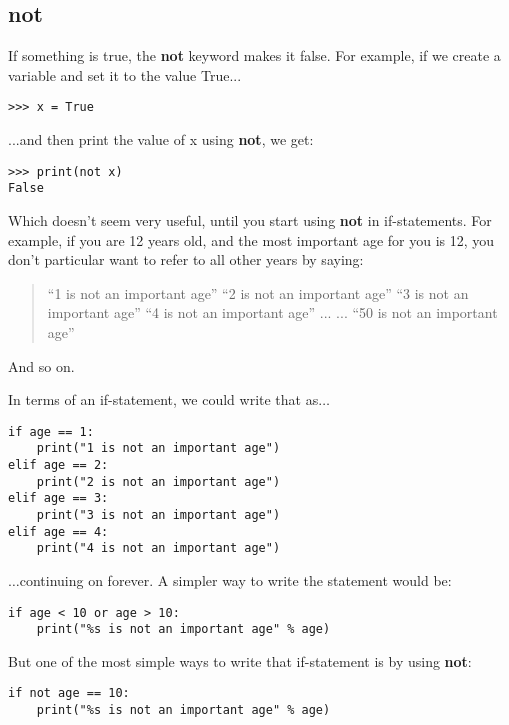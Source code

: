 \subsection*{not}

If something is true, the \textbf{not} keyword makes it false.  For example, if we create a variable  and set it to the value True...

\begin{Verbatim}[frame=single]
>>> x = True
\end{Verbatim}

...and then print the value of x using \textbf{not}, we get:

\begin{Verbatim}[frame=single]
>>> print(not x)
False
\end{Verbatim}

Which doesn't seem very useful, until you start using \textbf{not} in if-statements.  For example, if you are 12 years old, and the most important age for you is 12, you don't particular want to refer to all other years by saying:

\begin{quotation}
``1 is not an important age''
``2 is not an important age''
``3 is not an important age''
``4 is not an important age''
...
...
``50 is not an important age''
\end{quotation}

And so on.
\par\noindent
In terms of an if-statement, we could write that as$\ldots$

\begin{Verbatim}[frame=single]
if age == 1:
    print("1 is not an important age")
elif age == 2:
    print("2 is not an important age")
elif age == 3:
    print("3 is not an important age")
elif age == 4:
    print("4 is not an important age")
\end{Verbatim}

\noindent
$\ldots$continuing on forever. A simpler way to write the statement would be:

\begin{Verbatim}[frame=single]
if age < 10 or age > 10:
    print("%s is not an important age" % age)
\end{Verbatim}

\noindent
But one of the most simple ways to write that if-statement is by using \textbf{not}:

\begin{Verbatim}[frame=single]
if not age == 10:
    print("%s is not an important age" % age)
\end{Verbatim}

